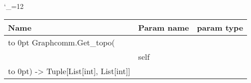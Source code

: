 \begingroup \catcode`\_=12 \tt
\begin{tabular}{lll}
\toprule
\textrm{Name}&\textrm{Param name}&\textrm{param type}\\
\midrule
\hbox to 0pt {Graphcomm.Get_topo(\hss}\\
& self\\
\hbox to 0pt{) -> Tuple[List[int], List[int]]\hss}\\
\bottomrule
\end{tabular}
\endgroup
